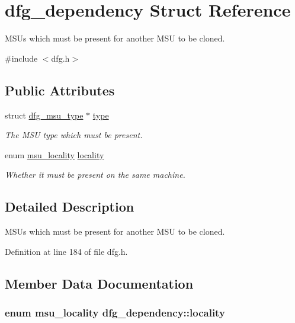 \hypertarget{structdfg__dependency}{\section{dfg\-\_\-dependency Struct Reference}
\label{structdfg__dependency}
}


M\-S\-Us which must be present for another M\-S\-U to be cloned.  




{\ttfamily \#include $<$dfg.\-h$>$}

\subsection*{Public Attributes}
\begin{DoxyCompactItemize}
\item 
struct \hyperlink{structdfg__msu__type}{dfg\-\_\-msu\-\_\-type} $\ast$ \hyperlink{structdfg__dependency_a0aa6bde8bdcb9cbf14d8ceb86552af21}{type}
\begin{DoxyCompactList}\small\item\em The M\-S\-U type which must be present. \end{DoxyCompactList}\item 
enum \hyperlink{dfg_8h_a97b014aefcfb738ba60c39a3bbd44c31}{msu\-\_\-locality} \hyperlink{structdfg__dependency_a76baa564596b3c787f536a3373113827}{locality}
\begin{DoxyCompactList}\small\item\em Whether it must be present on the same machine. \end{DoxyCompactList}\end{DoxyCompactItemize}


\subsection{Detailed Description}
M\-S\-Us which must be present for another M\-S\-U to be cloned. 

Definition at line 184 of file dfg.\-h.



\subsection{Member Data Documentation}
\hypertarget{structdfg__dependency_a76baa564596b3c787f536a3373113827}{
\subsubsection[{locality}]{\setlength{\rightskip}{0pt plus 5cm}enum {\bf msu\-\_\-locality} dfg\-\_\-dependency\-::locality}}\label{structdfg__dependency_a76baa564596b3c787f536a3373113827}


